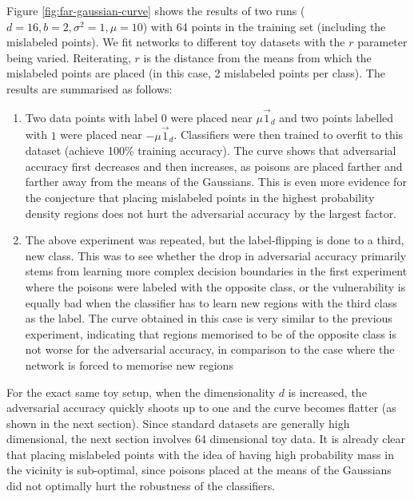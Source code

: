 \documentclass{ociamthesis}
\begin{document}
Figure \ref{fig:far-gaussian-curve} shows the results of two runs ($d=16, b=2,
\sigma^2=1, \mu=10$) with 64 points in the training set (including the
mislabeled points). We fit networks to different toy datasets with the $r$
parameter being varied. Reiterating, $r$ is the distance from the means from
which the mislabeled points are placed (in this case, 2 mislabeled points per
class). The results are summarised as follows:

\begin{enumerate}
    \item Two data points with label $0$ were placed near $\mu\vec{1}_d$ and two
    points labelled with $1$ were placed near $-\mu\vec{1}_d$. Classifiers were
    then trained to overfit to this dataset (achieve 100\% training accuracy).
    The curve shows that adversarial accuracy first decreases and then
    increases, as poisons are placed farther and farther away from the means of
    the Gaussians. This is even more evidence for the conjecture that placing
    mislabeled points in the highest probability density regions does not hurt
    the adversarial accuracy by the largest factor.
    \item The above experiment was repeated, but the label-flipping is done to a
    third, new class. This was to see whether the drop in adversarial accuracy
    primarily stems from learning more complex decision boundaries in the first
    experiment where the poisons were labeled with the opposite class, or the
    vulnerability is equally bad when the classifier has to learn new regions
    with the third class as the label. The curve obtained in this case is very
    similar to the previous experiment, indicating that regions memorised to be
    of the opposite class is not worse for the adversarial accuracy, in
    comparison to the case where the network is forced to memorise new regions
\end{enumerate}

For the exact same toy setup, when the dimensionality $d$ is increased, the
adversarial accuracy quickly shoots up to one and the curve becomes flatter (as
shown in the next section). Since standard datasets are generally high
dimensional, the next section involves 64 dimensional toy data. It is already
clear that placing mislabeled points with the idea of having high probability
mass in the vicinity is sub-optimal, since poisons placed at the means of the
Gaussians did not optimally hurt the robustness of the classifiers.
\end{document}
